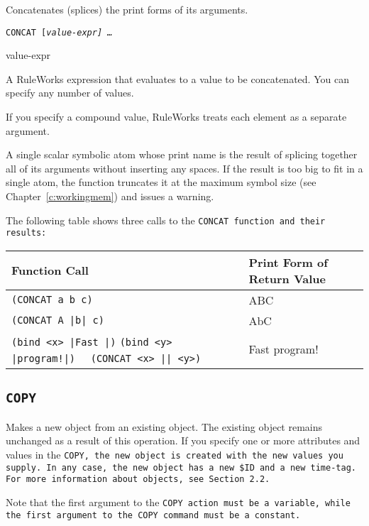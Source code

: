 Concatenates (splices) the print forms of its arguments.

\Format

\tt{CONCAT} [\it{value-expr}] \ldots

\begin{arguments}
\item[value-expr]

  A RuleWorks expression that evaluates to a value to be
  concatenated. You can specify any number of values.

  If you specify a compound value, RuleWorks treats each element as a
  separate argument.
\end{arguments}

\ReturnValue

A single scalar symbolic atom whose print name is the result of
splicing together all of its arguments without inserting any
spaces. If the result is too big to fit in a single atom, the function
truncates it at the maximum symbol size (see
Chapter~\ref{c:workingmem}) and issues a warning.

\Example

The following table shows three calls to the \tt{CONCAT} function and
their results:

\begin{tabularx}{\columnwidth}{Xl}
  \toprule
  Function Call & Print Form of Return Value \\
  \midrule
  \verb,(CONCAT a b c), & ABC \\
  \verb,(CONCAT A |b| c), & AbC \\
  \raggedright
  \verb,(bind <x> |Fast |), \verb,(bind <y> |program!|), \verb,  (CONCAT <x> || <y>), &  Fast program! \\
  \bottomrule
\end{tabularx}


\subsection{\tt{COPY}}

Makes a new object from an existing object. The existing object
remains unchanged as a result of this operation. If you specify
one or more attributes and values in the \tt{COPY}, the new object is
created with the new values you supply. In any case, the new
object has a new \verb|$ID| and a new time-tag. For more information
about objects, see Section 2.2.

Note that the first argument to the \tt{COPY} action must be a
variable, while the first argument to the \tt{COPY} command must be a
constant.

